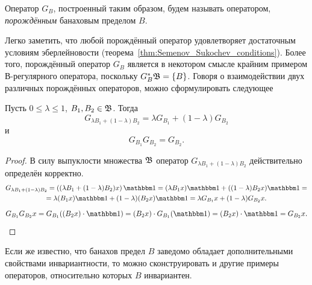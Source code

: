 \begin{definition}
	Оператор $G_B$, построенный таким образом, будем называть оператором,
	\emph{порождённым} банаховым пределом $B$.
\end{definition}

	Легко заметить, что любой порождённый оператор удовлетворяет достаточным условиям эберлейновости
	(теорема~\ref{thm:Semenov_Sukochev_conditions}).
	Более того, порождённый оператор $G_B$ является в некотором смысле крайним примером В-регулярного оператора,
	поскольку $G_B^* \mathfrak{B} = \{B\}$.
	Говоря о взаимодействии двух различных порождённых операторов,
	можно сформулировать следующее

\begin{proposition}
	Пусть $0 \leq \lambda \leq 1$, $B_1, B_2 \in \mathfrak{B}$.
	Тогда
	\begin{equation}
		G_{\lambda B_1+(1-\lambda) B_2} =\lambda G_{B_1} + (1-\lambda)G_{B_2}
	\end{equation}
	и
	\begin{equation}
		G_{B_1} G_{B_2} = G_{B_2}
		.
	\end{equation}
\end{proposition}


\begin{proof}
	В силу выпуклости множества $\mathfrak{B}$ оператор $G_{\lambda B_1+(1-\lambda) B_2}$
	действительно определён корректно.
	\begin{multline}
		G_{\lambda B_1+(1-\lambda) B_2} =
		\left((\lambda B_1+(1-\lambda) B_2) x\right)\one =
		(\lambda B_1 x) \one +((1-\lambda) B_2 x)\one =
		\\=
		\lambda (B_1 x) \one +(1-\lambda) (B_2 x)\one =
		\lambda G_{B_1} x +(1-\lambda) G_{B_2} x
		.
	\end{multline}
	\begin{equation}
		G_{B_1}G_{B_2}x =
		G_{B_1} ( (B_2 x) \cdot \one ) =
		(B_2 x) \cdot G_{B_1} ( \one ) =
		(B_2 x) \cdot  \one =
		G_{B_2}x
		.
	\end{equation}
\end{proof}


Если же известно, что банахов предел $B$ заведомо обладает дополнительными свойствами инвариантности,
то можно сконструировать и другие примеры операторов, относительно которых $B$ инвариантен.

